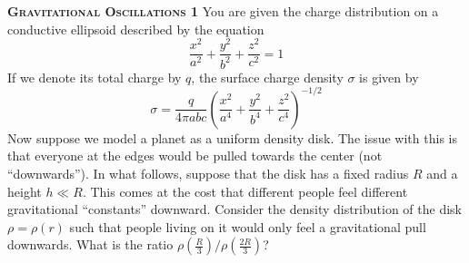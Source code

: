 \begin{problem}
\textbf{\textsc{Gravitational Oscillations 1}}
You are given the charge distribution on a conductive ellipsoid described by the equation 
\[
\frac{x^2}{a^2} + \frac{y^2}{b^2} + \frac{z^2}{c^2} = 1
\]
If we denote its total charge by \(q\), the surface charge density \(\sigma\) is given by
\begin{equation*}
\sigma = \frac{q}{4\pi abc} \left( \frac{x^2}{a^4} + \frac{y^2}{b^4} + \frac{z^2}{c^4} \right)^{-1 / 2}
\label{ellipsoidCharge}
\end{equation*}
Now suppose we model a planet as a uniform density disk. The issue with this is that everyone at the edges would be pulled towards the center (not ``downwards''). In what follows, suppose that the disk has a fixed radius \(R\) and a height \(h \ll R\). This comes at the cost that different people feel different gravitational ``constants'' downward. Consider the density distribution of the disk \(\rho = \rho(r)\) such that people living on it would only feel a gravitational pull downwards. What is the ratio $\rho(\frac{R}{3})/\rho(\frac{2R}{3})$?

\end{problem}
